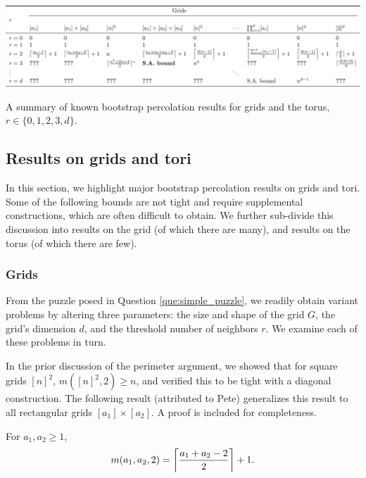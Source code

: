 \begin{table}[]
\centering
\includegraphics[width=\textwidth,origin=c]{tables/1/known_bounds.pdf}
\caption{A summary of known bootstrap percolation results for grids and the torus, $r \in \{0,1,2,3,d\}$.}
\label{tab:known_bounds}
\end{table} 

\subsection{Results on grids and tori}
\label{sec:result_summary}

In this section, we highlight major bootstrap percolation results on grids and tori. Some of the following bounds are not tight and require supplemental constructions, which are often difficult to obtain. We further sub-divide this discussion into results on the grid (of which there are many), and results on the torus (of which there are few).

\subsubsection{Grids}

From the puzzle posed in Question \ref{que:simple_puzzle}, we readily obtain variant problems by altering three parameters: the size and shape of the grid $G$, the grid's dimension $d$, and the threshold number of neighbors $r$. We examine each of these problems in turn.

In the prior discussion of the perimeter argument, we showed that for square grids $[n]^2$, $m([n]^2, 2) \geq n$, and verified this to be tight with a diagonal construction. The following result (attributed to Pete) generalizes this result to all rectangular grids $[a_1] \times [a_2]$. A proof is included for completeness. 

\begin{thm}
\label{thm:perimeter_rects}
For $a_1, a_2 \geq 1$,
$$m(a_1,a_2,2) = \ceil*{\frac{a_1+a_2-2}{2}}+1.$$
\end{thm}

